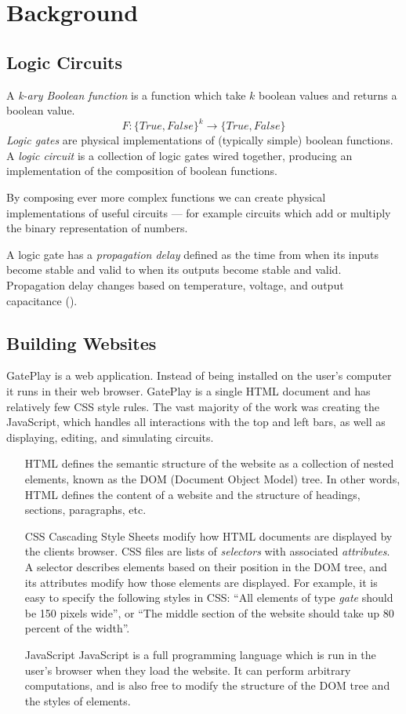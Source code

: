 \chapter{Background}
\label{chapter:background}

\section{Logic Circuits}
\label{sec:circuits}
A \textit{k-ary Boolean function} is a function which take $k$ boolean values and returns a boolean value.
\[ F : \{True, False\}^k \rightarrow \{True, False\} \]
\textit{Logic gates} are physical implementations of (typically simple) boolean functions. A \textit{logic circuit} is a collection of logic gates wired together, producing an implementation of the composition of boolean functions.

By composing ever more complex functions we can create physical implementations of useful circuits --- for example circuits which add or multiply the binary representation of numbers.

A logic gate has a \textit{propagation delay} defined as the time from when its inputs become stable and valid to when its outputs become stable and valid. Propagation delay changes based on temperature, voltage, and output capacitance (\cite{Wikipedia: Propagation Delay}).

\section{Building Websites}
GatePlay is a web application. Instead of being installed on the user's computer it runs in their web browser. GatePlay is a single HTML document and has relatively few CSS style rules. The vast majority of the work was creating the JavaScript, which handles all interactions with the top and left bars, as well as displaying, editing, and simulating circuits.

\begin{itemize}
	\item[HTML] defines the semantic structure of the website as a collection of nested elements, known as the DOM (Document Object Model) tree. In other words, HTML defines the content of a website and the structure of headings, sections, paragraphs, etc.
	
	\item[CSS] Cascading Style Sheets modify how HTML documents are displayed by the clients browser. CSS files are lists of \textit{selectors} with associated \textit{attributes}. A selector describes elements based on their position in the DOM tree, and its attributes modify how those elements are displayed. For example, it is easy to specify the following styles in CSS: ``All elements of type \textit{gate} should be 150 pixels wide'', or ``The middle section of the website should take up 80 percent of the width''.
	
	\item[JavaScript] JavaScript is a full programming language which is run in the user's browser when they load the website. It can perform arbitrary computations, and is also free to modify the structure of the  DOM tree and the styles of elements.
\end{itemize}

